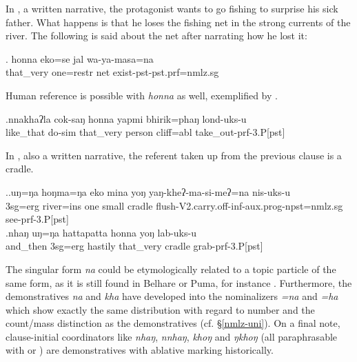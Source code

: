 In \Next, a written narrative, the protagonist wants to go fishing to surprise his sick father. What happens is that he loses the fishing net in the strong currents of the river. The following is said about the net after narrating how he lost it:

\exg. honna           eko=se          jal wa-ya-masa=na\\
that\_very one{\sc =restr} net exist{\sc [3sg]-pst-pst.prf=nmlz.sg}\\
  

Human reference is possible with \emph{honna} as well, exemplified by \Next.
 
\exg.nnakhaʔla   cok-saŋ       honna    yapmi  bhirik=phaŋ   lond-uks-u\\
like\_that do{\sc -sim} that\_very  person cliff{\sc =abl} take\_out{\sc -prf-3.P[pst]}\\
 

In \Next, also a written narrative, the referent taken up from the previous clause is a cradle. 

\ex.\ag.uŋ=ŋa   hoŋma=ŋa   eko mina  yoŋ   yaŋ-kheʔ-ma-si-meʔ=na   nis-uks-u\\
{\sc 3sg=erg} river{\sc =ins} one small cradle flush{\sc -V2.carry.off-inf-aux.prog-npst=nmlz.sg} see{\sc -prf-3.P[pst]}\\
 
\bg.nhaŋ    uŋ=ŋa   hattapatta honna        yoŋ   lab-uks-u\\
and\_then {\sc 3sg=erg} hastily that\_very  cradle grab{\sc -prf-3.P[pst]}\\
 


The singular form  \emph{na} could be etymologically related to a topic particle of the same form, as it is still found in Belhare or Puma, for instance \citep[559]{Bickel2003Belhare, Bickeletal2009Puma}. Furthermore, the demonstratives \emph{na} and \emph{kha} have  developed into the nominalizers \emph{=na} and \emph{=ha} which show exactly the same distribution with regard to number and the count/mass distinction as the demonstratives (cf. §\ref{nmlz-uni}). On a final note, clause-initial coordinators like \emph{nhaŋ}, \emph{nnhaŋ}, \emph{khoŋ} and \emph{ŋkhoŋ} (all paraphrasable with  or ) are demonstratives with ablative marking historically.


